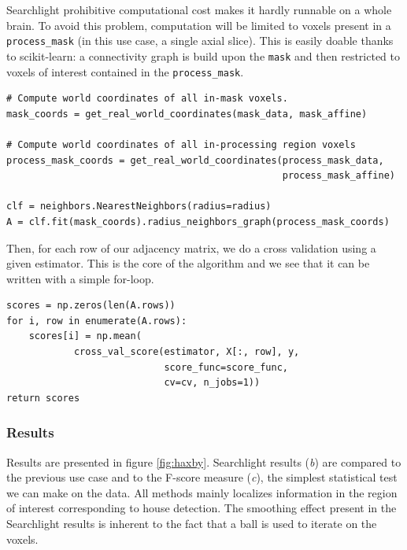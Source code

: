 \documentclass{frontiersSCNS} %
\begin{document}
Searchlight prohibitive computational cost makes it hardly runnable on a whole
brain. To avoid this problem, computation will be limited to voxels present in a
\texttt{process\_mask} (in this use case, a single axial slice). This is easily
doable thanks to scikit-learn: a connectivity graph is build upon the
\texttt{mask} and then restricted to voxels of interest contained in the 
\texttt{process\_mask}.

\begin{lstlisting}
# Compute world coordinates of all in-mask voxels.
mask_coords = get_real_world_coordinates(mask_data, mask_affine)

# Compute world coordinates of all in-processing region voxels
process_mask_coords = get_real_world_coordinates(process_mask_data,
                                                 process_mask_affine)

clf = neighbors.NearestNeighbors(radius=radius)
A = clf.fit(mask_coords).radius_neighbors_graph(process_mask_coords)
\end{lstlisting}

Then, for each row of our adjacency matrix, we do a cross validation using a
given estimator. This is the core of the algorithm and we see that it can be
written with a simple for-loop.

\begin{lstlisting}
scores = np.zeros(len(A.rows))
for i, row in enumerate(A.rows):
    scores[i] = np.mean(
            cross_val_score(estimator, X[:, row], y,
                            score_func=score_func,
                            cv=cv, n_jobs=1))
return scores
\end{lstlisting}

\subsubsection{Results}

Results are presented in figure \ref{fig:haxby}. Searchlight results
(\textit{b}) are compared to the previous use case and to the F-score measure
(\textit{c}), the simplest statistical test we can make on the data.
All methods mainly localizes information in the region of
interest corresponding to house detection. The smoothing effect present in the
Searchlight results is inherent to the fact that a ball is used to iterate on
the voxels.

\end{document}
